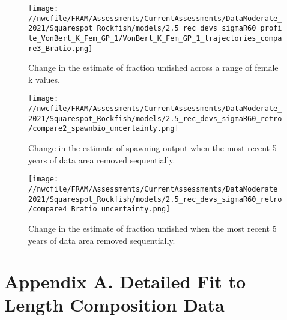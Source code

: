 \documentclass[11pt,
  english,
  a4paper,
]{article}
\begin{document}
\tagmcend\tagstructend


\begin{figure}
\centering
\texttt{[image: //nwcfile/FRAM/Assessments/CurrentAssessments/DataModerate\_2021/Squarespot\_Rockfish/models/2.5\_rec\_devs\_sigmaR60\_profile\_VonBert\_K\_Fem\_GP\_1/VonBert\_K\_Fem\_GP\_1\_trajectories\_compare3\_Bratio.png]}
\caption{Change in the estimate of fraction unfished across a range of female k values.\label{fig:k-depl}}
\end{figure}

\tagmcend\tagstructend


\begin{figure}
\centering
\texttt{[image: //nwcfile/FRAM/Assessments/CurrentAssessments/DataModerate\_2021/Squarespot\_Rockfish/models/2.5\_rec\_devs\_sigmaR60\_retro/compare2\_spawnbio\_uncertainty.png]}
\caption{Change in the estimate of spawning output when the most recent 5 years of data area removed sequentially.\label{fig:retro-ssb}}
\end{figure}

\tagmcend\tagstructend


\begin{figure}
\centering
\texttt{[image: //nwcfile/FRAM/Assessments/CurrentAssessments/DataModerate\_2021/Squarespot\_Rockfish/models/2.5\_rec\_devs\_sigmaR60\_retro/compare4\_Bratio\_uncertainty.png]}
\caption{Change in the estimate of fraction unfished when the most recent 5 years of data area removed sequentially.\label{fig:retro-depl}}
\end{figure}

\tagmcend\tagstructend

\newpage

\clearpage


\hypertarget{appendix-a.-detailed-fit-to-length-composition-data}{%
\section{Appendix A. Detailed Fit to Length Composition Data}\label{appendix-a.-detailed-fit-to-length-composition-data}}
\end{document}
